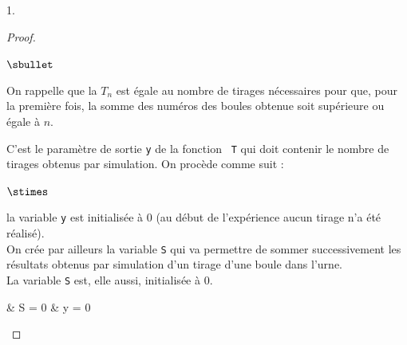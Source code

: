 \documentclass[11pt]{article}%
\begin{document}
\begin{noliste}{1.}
    \begin{proof}~
      \begin{noliste}{$\sbullet$}
      \item On rappelle que la \var $T_n$ est égale au nombre de tirages
        nécessaires pour que, pour la première fois, la somme des
        numéros des boules obtenue soit supérieure ou égale à $n$.

      \item C'est le paramètre de sortie {\tt y} de la fonction {\tt
          T} qui doit contenir le nombre de tirages obtenus par
        simulation. On procède comme suit :
        \begin{noliste}{$\stimes$}
        \item la variable {\tt y} est initialisée à $0$ (au
          début de l'expérience aucun tirage n'a été réalisé).\\
          On crée par ailleurs la variable {\tt S} qui va permettre de
          sommer successivement les résultats obtenus par simulation
          d'un tirage d'une boule dans l'urne.\\
          La variable {\tt S} est, elle aussi, initialisée à 
	  $0$.\\[-.2cm]
          \begin{scilabC}{1}
            & \qquad S = 0 \nl %
            & \qquad y = 0 \nl %
          \end{scilabC}


\end{noliste}
\end{noliste}
\end{proof}
\end{noliste}
\end{document}
